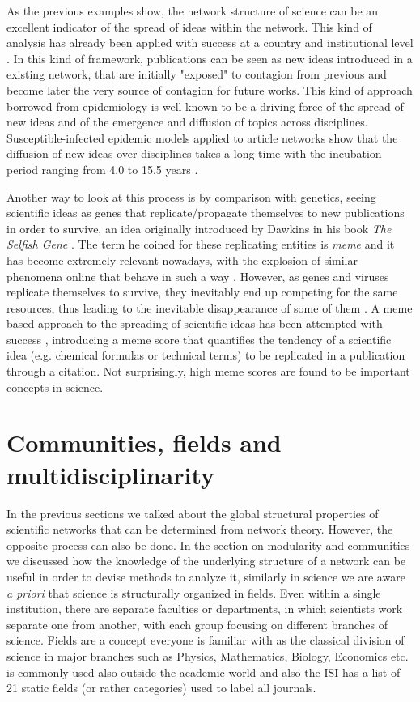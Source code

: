 As the previous examples show, the network structure of science can be an excellent indicator of the spread of ideas within the network. 
This kind of analysis has already been applied with success at a country and institutional
level \cite{Borner2006}. In this kind of framework, publications can be seen as new ideas introduced in a existing network, 
that are initially "exposed" to contagion from previous and become later the very source
of contagion for future works. This kind of approach borrowed from epidemiology \cite{Christakis2012}
is well known to be a driving force of the spread of new ideas \cite{Bettencourt2006513} and of the emergence and diffusion of topics across
disciplines. Susceptible-infected epidemic models applied to article networks
show that the diffusion of new ideas over disciplines takes a long time with the incubation period ranging from 4.0 to 15.5 years \cite{Kiss201074}. 

Another way to look at this process
is by comparison with genetics, seeing scientific ideas as genes that replicate/propagate themselves
to new publications in order to survive, an idea originally introduced by Dawkins in his book \textit{The Selfish Gene} \cite{selfishgene}. The term he coined
for these replicating entities is \textit{meme} and it has become extremely relevant nowadays, with the explosion of similar phenomena online that 
behave in such a way \cite{Leskovec:2009:MDN:1557019.1557077}. However, as genes and viruses replicate themselves to survive, they inevitably
end up competing for the same resources, thus leading to the inevitable disappearance of some of them \cite{Weng2012}. A meme based approach to
the spreading of scientific ideas has been attempted with success \cite{PhysRevX.4.041036}, introducing a meme score that quantifies the tendency of a 
scientific idea (e.g. chemical formulas or technical terms) to be replicated in a publication through a citation. Not surprisingly, high meme scores
are found to be important concepts in science.


\section{Communities, fields and multidisciplinarity}

In the previous sections we talked about the global structural properties of scientific networks that can be determined from network theory. However, the opposite process
can also be done. In the section on modularity and communities we discussed how the knowledge of the underlying structure of a network can be useful in order to devise methods
to analyze it, similarly in science we are aware \textit{a priori} that science is structurally organized in fields. Even within a single institution, there are separate
faculties or departments, in which scientists work separate one from another, with each group focusing on different branches of science. Fields are a concept everyone is familiar with
as the classical division of science in major branches such as Physics, Mathematics, Biology, Economics etc. is commonly used also outside the academic world and also
the ISI has a list of 21 static fields (or rather categories) used to label all journals. 

